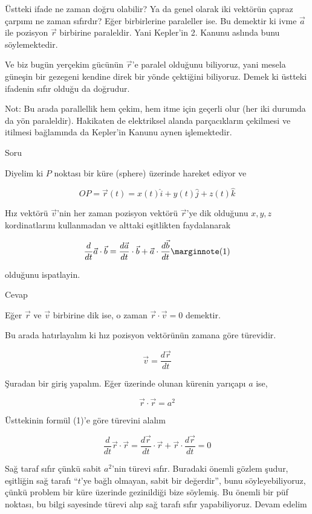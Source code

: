 \documentclass[12pt,fleqn]{article}\usepackage{../../common}
\begin{document}
Üstteki ifade ne zaman doğru olabilir? Ya da genel olarak iki vektörün çapraz
çarpımı ne zaman sıfırdır? Eğer birbirlerine paraleller ise. Bu demektir ki ivme
$\vec{a}$ ile pozisyon $\vec{r}$ birbirine paraleldir. Yani Kepler'in 2. Kanunu
aslında bunu söylemektedir.

Ve biz bugün yerçekim gücünün $\vec{r}$'e paralel olduğunu biliyoruz, yani
mesela güneşin bir gezegeni kendine direk bir yönde çektiğini biliyoruz. Demek
ki üstteki ifadenin sıfır olduğu da doğrudur.

Not: Bu arada parallellik hem çekim, hem itme için geçerli olur (her iki durumda
da yön paraleldir). Hakikaten de elektriksel alanda parçacıkların çekilmesi ve
itilmesi bağlamında da Kepler'in Kanunu aynen işlemektedir.

Soru

Diyelim ki $P$ noktası bir küre (sphere) üzerinde hareket ediyor ve 

$$ OP = \vec{r}(t) = x(t)\hat{i} + y(t)\hat{j} + z(t)\hat{k}  $$

Hız vektörü $\vec{v}$'nin her zaman pozisyon vektörü $\vec{r}$'ye dik
olduğunu $x,y,z$ kordinatlarını kullanmadan ve alttaki eşitlikten 
faydalanarak

$$
\frac{d}{dt}\vec{a} \cdot \vec{b} =  
\frac{d\vec{a}}{dt} \cdot \vec{b} +
\vec{a} \cdot \frac{d\vec{b}}{dt} 
\mlabel{1}
$$

olduğunu ispatlayin. 

Cevap

Eğer $\vec{r}$ ve $\vec{v}$ birbirine dik ise, o zaman $\vec{r} \cdot
\vec{v} = 0$ demektir. 

Bu arada hatırlayalım ki hız pozisyon vektörünün zamana göre türevidir. 

$$ \vec{v} = \frac{d\vec{r}}{dt} $$

Şuradan bir giriş yapalım. Eğer üzerinde olunan kürenin yarıçapı $a$ ise, 

$$ \vec{r} \cdot \vec{r} = a^2 $$

Üsttekinin formül (1)'e göre türevini alalım

$$ 
\frac{d}{dt}\vec{r} \cdot \vec{r} =  
\frac{d\vec{r}}{dt} \cdot \vec{r} +
\vec{r} \cdot \frac{d\vec{r}}{dt} = 0
 $$

Sağ taraf sıfır çünkü sabit $a^2$'nin türevi sıfır. Buradaki önemli gözlem
şudur, eşitliğin sağ tarafı ``$t$'ye bağlı olmayan, sabit bir değerdir'', bunu
söyleyebiliyoruz, çünkü problem bir küre üzerinde gezinildiği bize söylemiş. Bu
önemli bir püf noktası, bu bilgi sayesinde türevi alıp sağ tarafı sıfır
yapabiliyoruz. Devam edelim
\end{document}
